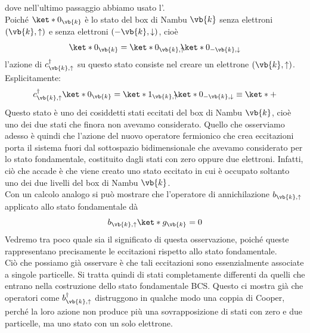 dove nell'ultimo passaggio abbiamo usato l'.\\
Poiché $\ket*{0_{\vb{k}}}$ è lo stato del box di Nambu $\vb{k}$ senza elettroni $(\vb{k},\uparrow)$ e senza elettroni $(-\vb{k},\downarrow)$, cioè
\begin{equation*}
   \ket*{0_{\vb{k}}}=\ket*{0_{\vb{k},\uparrow}} \hspace{-0.17cm} \ket*{0_{-\vb{k},\downarrow}}
\end{equation*}
l'azione di $c^{\dag}_{\vb{k},\uparrow}$ su questo stato consiste nel creare un elettrone $(\vb{k},\uparrow)$. Esplicitamente:
\begin{equation*}
   c^{\dag}_{\vb{k},\uparrow} \ket*{0_{\vb{k}}}
   =\ket*{1_{\vb{k},\uparrow}} \hspace{-0.17cm} \ket*{0_{-\vb{k},\downarrow}}
   \equiv \ket*{+}
\end{equation*}
Questo stato è uno dei cosiddetti stati eccitati del box di Nambu $\vb{k}$, cioè uno dei due stati che finora non avevamo considerato. Quello che osserviamo adesso è quindi che l'azione del nuovo operatore fermionico che crea eccitazioni porta il sistema fuori dal sottospazio bidimensionale che avevamo considerato per lo stato fondamentale, costituito dagli stati con zero oppure due elettroni. Infatti, ciò che accade è che viene creato uno stato eccitato in cui è occupato soltanto uno dei due livelli del box di Nambu $\vb{k}$.\\
Con un calcolo analogo si può mostrare che l'operatore di annichilazione $b_{\vb{k},\uparrow}$ applicato allo stato fondamentale dà
\begin{equation*}
   b_{\vb{k},\uparrow}
   \ket*{g_{\vb{k}}}
   =
   0
\end{equation*}
Vedremo tra poco quale sia il significato di questa osservazione, poiché queste rappresentano precisamente le eccitazioni rispetto allo stato fondamentale.\\
Ciò che possiamo già osservare è che tali eccitazioni sono essenzialmente associate a singole particelle. Si tratta quindi di stati completamente differenti da quelli che entrano nella costruzione dello stato fondamentale BCS. Questo ci mostra già che operatori come $b^{\dag}_{\vb{k},\uparrow}$ distruggono in qualche modo una coppia di Cooper, perché la loro azione non produce più una sovrapposizione di stati con zero e due particelle, ma uno stato con un solo elettrone.
